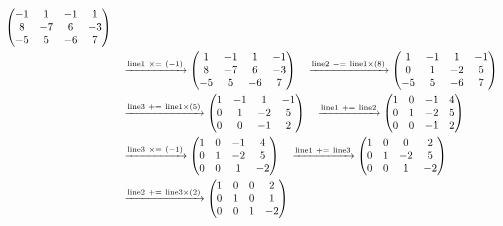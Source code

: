 \documentclass{ltjsarticle}
\begin{document}
\begin{align*}
 \begin{pmatrix}
 -1 & 1 & -1 & 1\\
 8 & - 7 & 6 & - 3\\
 - 5 & 5 & - 6 & 7
\end{pmatrix}\allowdisplaybreaks\\
&\ \ \ \xrightarrow{ \text{line} 1 \ \times=\ \left( - 1 \right)} %
\begin{pmatrix}
 1 & -1 & 1 & -1\\
 8 & - 7 & 6 & - 3\\
 - 5 & 5 & - 6 & 7
\end{pmatrix}\ \ \ \xrightarrow{ \text{line} 2 \ -=\  \text{line} 1 \times\left( 8 \right)} %
\begin{pmatrix}
 1 & -1 & 1 & -1\\
 0 & 1 & - 2 & 5\\
 - 5 & 5 & - 6 & 7
\end{pmatrix}\allowdisplaybreaks\\
&\ \ \ \xrightarrow{ \text{line} 3 \ +=\  \text{line} 1 \times\left( 5 \right)} %
\begin{pmatrix}
 1 & -1 & 1 & -1\\
 0 & 1 & - 2 & 5\\
 0 & 0 & -1 & 2
\end{pmatrix}\ \ \ \xrightarrow{ \text{line} 1 \ +=\  \text{line} 2 } %
\begin{pmatrix}
 1 & 0 & -1 & 4\\
 0 & 1 & - 2 & 5\\
 0 & 0 & -1 & 2
\end{pmatrix}\allowdisplaybreaks\\
&\ \ \ \xrightarrow{ \text{line} 3 \ \times=\ \left( - 1 \right)} %
\begin{pmatrix}
 1 & 0 & -1 & 4\\
 0 & 1 & - 2 & 5\\
 0 & 0 & 1 & - 2
\end{pmatrix}\ \ \ \xrightarrow{ \text{line} 1 \ +=\  \text{line} 3 } %
\begin{pmatrix}
 1 & 0 & 0 & 2\\
 0 & 1 & - 2 & 5\\
 0 & 0 & 1 & - 2
\end{pmatrix}\allowdisplaybreaks\\
&\ \ \ \xrightarrow{ \text{line} 2 \ +=\  \text{line} 3 \times\left( 2 \right)} %
\begin{pmatrix}
 1 & 0 & 0 & 2\\
 0 & 1 & 0 & 1\\
 0 & 0 & 1 & - 2
\end{pmatrix}
\end{align*}
\end{document}
